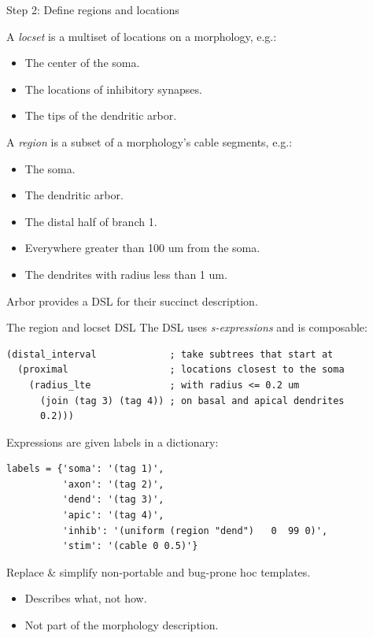 \documentclass[aspectratio=43]{beamer}
\newcommand{\arbor}{{\ttfamily Arbor}\xspace}
\begin{document}
\begin{frame}[fragile]{Step 2: Define regions and locations}

    A \emph{locset} is a multiset of locations on a morphology, e.g.:
    \begin{itemize}
        \item The center of the soma.
        \item The locations of inhibitory synapses.
        \item The tips of the dendritic arbor.
    \end{itemize}
    \vspace{5pt}

    A \emph{region} is a subset of a morphology's cable segments, e.g.:
    \begin{itemize}
        \item The soma.
        \item The dendritic arbor.
        \item The distal half of branch 1.
        \item Everywhere greater than 100 um from the soma.
        \item The dendrites with radius less than 1 um.
    \end{itemize}
    \vspace{5pt}
    \arbor provides a DSL for their succinct description.

\end{frame}

\begin{frame}[fragile]{The region and locset DSL}
    The DSL uses \emph{s-expressions} and is composable:

    \begin{lstlisting}[style=arblang]
(distal_interval             ; take subtrees that start at
  (proximal                  ; locations closest to the soma
    (radius_lte              ; with radius <= 0.2 um
      (join (tag 3) (tag 4)) ; on basal and apical dendrites
      0.2)))
    \end{lstlisting}

    Expressions are given labels in a dictionary:

    \begin{lstlisting}[style=talkpython]
labels = {'soma': '(tag 1)',
          'axon': '(tag 2)',
          'dend': '(tag 3)',
          'apic': '(tag 4)',
          'inhib': '(uniform (region "dend")   0  99 0)',
          'stim': '(cable 0 0.5)'}
    \end{lstlisting}

    Replace \& simplify non-portable and bug-prone hoc templates.
    \begin{itemize}
        \item Describes what, not how.
        \item Not part of the morphology description.
    \end{itemize}

\end{frame}
\end{document}
